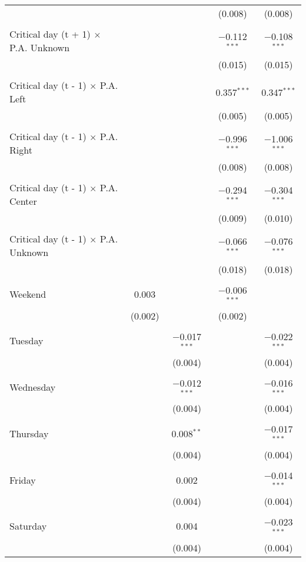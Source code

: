 \documentclass[
]{article}
\begin{document}
\begin{table}[!htbp]
{\begin{tabular}{@{\extracolsep{5pt}}lcccc}
  &  &  & (0.008) & (0.008) \\ 
  & & & & \\ 
 Critical day (t + 1) $\times$ P.A. Unknown &  &  & $-$0.112$^{***}$ & $-$0.108$^{***}$ \\ 
  &  &  & (0.015) & (0.015) \\ 
  & & & & \\ 
 Critical day (t - 1) $\times$ P.A. Left &  &  & 0.357$^{***}$ & 0.347$^{***}$ \\ 
  &  &  & (0.005) & (0.005) \\ 
  & & & & \\ 
 Critical day (t - 1) $\times$ P.A. Right &  &  & $-$0.996$^{***}$ & $-$1.006$^{***}$ \\ 
  &  &  & (0.008) & (0.008) \\ 
  & & & & \\ 
 Critical day (t - 1) $\times$ P.A. Center &  &  & $-$0.294$^{***}$ & $-$0.304$^{***}$ \\ 
  &  &  & (0.009) & (0.010) \\ 
  & & & & \\ 
 Critical day (t - 1) $\times$ P.A. Unknown &  &  & $-$0.066$^{***}$ & $-$0.076$^{***}$ \\ 
  &  &  & (0.018) & (0.018) \\ 
  & & & & \\ 
 Weekend & 0.003 &  & $-$0.006$^{***}$ &  \\ 
  & (0.002) &  & (0.002) &  \\ 
  & & & & \\ 
 Tuesday &  & $-$0.017$^{***}$ &  & $-$0.022$^{***}$ \\ 
  &  & (0.004) &  & (0.004) \\ 
  & & & & \\ 
 Wednesday &  & $-$0.012$^{***}$ &  & $-$0.016$^{***}$ \\ 
  &  & (0.004) &  & (0.004) \\ 
  & & & & \\ 
 Thursday &  & 0.008$^{**}$ &  & $-$0.017$^{***}$ \\ 
  &  & (0.004) &  & (0.004) \\ 
  & & & & \\ 
 Friday &  & 0.002 &  & $-$0.014$^{***}$ \\ 
  &  & (0.004) &  & (0.004) \\ 
  & & & & \\ 
 Saturday &  & 0.004 &  & $-$0.023$^{***}$ \\ 
  &  & (0.004) &  & (0.004) \\ 

\end{tabular}}
\end{table}
\end{document}
